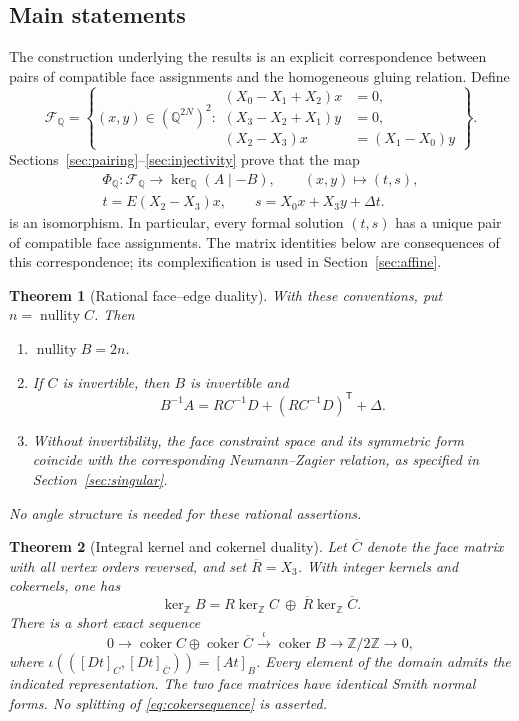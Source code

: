 \documentclass[11pt]{article}
\newtheorem{theorem}{Theorem}[section]
\theoremstyle{definition}\newtheorem{definition}[theorem]{Definition}
\theoremstyle{remark}\newtheorem{remark}[theorem]{Remark}
\DeclareMathOperator{\nullity}{nullity}
\DeclareMathOperator{\coker}{coker}
\newcommand{\Z}{\mathbb Z}
\newcommand{\Q}{\mathbb Q}
\newcommand{\Ct}{\overline C}
\newcommand{\Rt}{\overline R}
\begin{document}
\subsection{Main statements}

The construction underlying the results is an explicit correspondence
between pairs of compatible face assignments and the homogeneous
gluing relation. Define
\[
\mathcal F_{\Q}=\left\{(x,y)\in(\Q^{2N})^2:
\begin{aligned}
 (X_0-X_1+X_2)x&=0,\\
 (X_3-X_2+X_1)y&=0,\\
 (X_2-X_3)x&=(X_1-X_0)y
\end{aligned}\right\}.
\]
Sections~\ref{sec:pairing}--\ref{sec:injectivity} prove that the map
\[
\begin{gathered}
\Phi_{\Q}:\mathcal F_{\Q}\longrightarrow\ker_{\Q}(A\mid-B),
\qquad (x,y)\longmapsto(t,s),\\
t=E(X_2-X_3)x,\qquad s=X_0x+X_3y+\Delta t.
\end{gathered}
\]
is an isomorphism. In particular, every formal solution $(t,s)$ has
a unique pair of compatible face assignments. The matrix identities
below are consequences of this correspondence; its complexification
is used in Section~\ref{sec:affine}.

\begin{theorem}[Rational face--edge duality]\label{thm:main}
With these conventions, put $n=\nullity C$. Then
\begin{enumerate}
\item $\nullity B=2n$.
\item If $C$ is invertible, then $B$ is invertible and
\begin{equation}B^{-1}A=RC^{-1}D+(RC^{-1}D)^{\mathsf T}+\Delta.\label{eq:famed}\end{equation}
\item Without invertibility, the face constraint space and its symmetric form coincide with the corresponding Neumann--Zagier relation, as specified in Section~\ref{sec:singular}.
\end{enumerate}
No angle structure is needed for these rational assertions.
\end{theorem}

\begin{theorem}[Integral kernel and cokernel duality]\label{thm:integral}
Let $\Ct$ denote the face matrix with all vertex orders reversed, and set $\Rt=X_3$. With integer kernels and cokernels, one has
\begin{equation}\ker_{\Z}B=R\ker_{\Z}C\ \oplus\ \Rt\ker_{\Z}\Ct.\label{eq:integerkernel}\end{equation}
There is a short exact sequence
\begin{equation}0\longrightarrow\coker C\oplus\coker\Ct\xrightarrow{\ \iota\ }\coker B\longrightarrow\Z/2\Z\longrightarrow0,\label{eq:cokersequence}\end{equation}
where $\iota(([Dt]_C,[Dt]_{\Ct}))=[At]_B$. Every element of the domain admits the indicated representation. The two face matrices have identical Smith normal forms. No splitting of \eqref{eq:cokersequence} is asserted.
\end{theorem}
\end{document}
